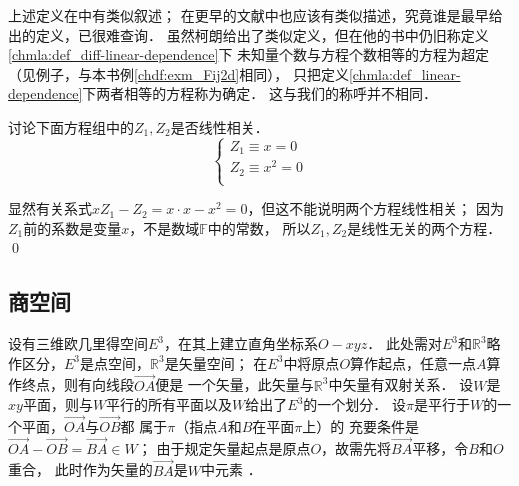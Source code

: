 上述定义在\textcite[p.16]{courant_hilbert-v2}中有类似叙述；
在更早的文献中也应该有类似描述，究竟谁是最早给出的定义，已很难查询．
虽然柯朗给出了类似定义，但在他的书中仍旧称定义\ref{chmla:def_diff-linear-dependence}下
未知量个数与方程个数相等的方程为{\kaishu 超定}
（见\parencite[p.16]{courant_hilbert-v2}例子，与本书例\ref{chdf:exm_Fij2d}相同），
只把定义\ref{chmla:def_linear-dependence}下两者相等的方程称为确定．
这与我们的称呼并不相同．


\begin{example}
    讨论下面方程组中的$Z_1,Z_2$是否线性相关．
    \begin{equation}\label{chhs:tmp_eqn00}
        \begin{cases}
            Z_1 \equiv x = 0  \\
            Z_2 \equiv x^2 = 0  \\
        \end{cases}
    \end{equation}
\end{example}
显然有关系式$x Z_1-Z_2=x\cdot x - x^2=0$，但这不能说明两个方程线性相关；
因为$Z_1$前的系数是变量$x$，不是数域$\mathbb{F}$中的常数，
所以$Z_1,Z_2$是线性无关的两个方程．
\qed


\subsection{商空间}\label{chmla:sec_quotient}

设有三维欧几里得空间$E^3$，在其上建立直角坐标系$O-xyz$．
此处需对$E^3$和$\mathbb{R}^3$略作区分，$E^3$是点空间，$\mathbb{R}^3$是矢量空间；
在$E^3$中将原点$O$算作起点，任意一点$A$算作终点，则有向线段$\overrightarrow{OA}$便是
一个矢量，此矢量与$\mathbb{R}^3$中矢量有双射关系．
设$W$是$xy$平面，则与$W$平行的所有平面以及$W$给出了$E^3$的一个划分．
设$\pi$是平行于$W$的一个平面，$\overrightarrow{OA}$与$\overrightarrow{OB}$都
属于$\pi$（指点$A$和$B$在平面$\pi$上）的
充要条件是$\overrightarrow{OA}-\overrightarrow{OB}=\overrightarrow{BA} \in W$；
由于规定矢量起点是原点$O$，故需先将$\overrightarrow{BA} $平移，令$B$和$O$重合，
此时作为矢量的$\overrightarrow{BA}$是$W$中元素 ．

